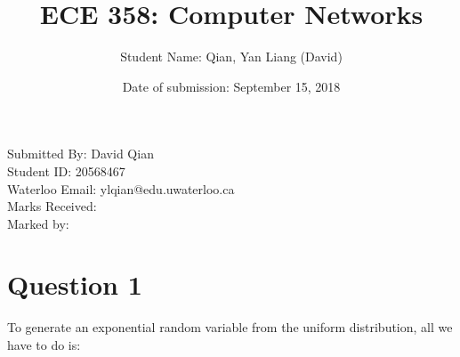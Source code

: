 \documentclass{article}
\title{ECE 358: Computer Networks}
\author{Student Name: Qian, Yan Liang (David)}
\date{Date of submission: September 15, 2018}
\begin{document}
\maketitle

\begin{center}
\vspace{4.0cm}
Submitted By: David Qian \\
\vspace{0.5cm}
Student ID: 20568467 \\
\vspace{0.5cm}
Waterloo Email: ylqian@edu.uwaterloo.ca \\
\vspace{5.0cm}
Marks Received: \\
\vspace{0.5cm}
Marked by: \\
\end{center}

\newpage

\tableofcontents

\section{Question 1}

To generate an exponential random variable from the uniform distribution, all we have to do is:
\end{document}
